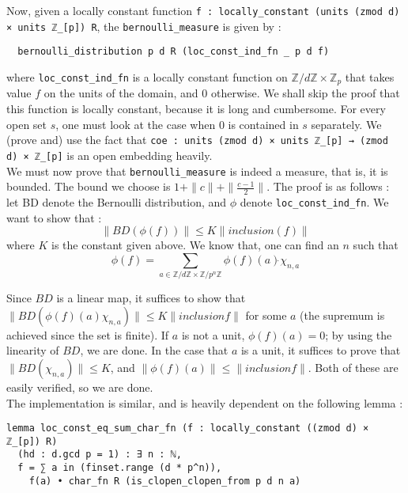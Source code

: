 \documentclass[a4paper,UKenglish,cleveref, autoref, thm-restate]{lipics-v2021}
\newcommand{\lean}[1]{\texttt{#1}\xspace} %
\begin{document}
Now, given a locally constant function \lean{f : locally\_constant (units (zmod d) × units ℤ\_[p]) R}, 
the \lean{bernoulli\_measure} is given by : 
\begin{lstlisting}
  bernoulli_distribution p d R (loc_const_ind_fn _ p d f)
\end{lstlisting}
where \lean{loc\_const\_ind\_fn} is a locally constant function on $\mathbb{Z}/d \mathbb{Z} \times \mathbb{Z}_p$ 
that takes value $f$ on the units of the domain, and 0 otherwise. We shall skip the proof that this function is 
locally constant, because it is long and cumbersome. For every open set $s$, one must look at the case when 0 is 
contained in $s$ separately. We (prove and) use the fact that \lean{coe : units (zmod d) × units ℤ\_[p] → (zmod d) × ℤ\_[p]} 
is an open embedding heavily. \\

We must now prove that \lean{bernoulli\_measure} is indeed a measure, that is, it is bounded. The bound we choose is 
$1 + \parallel c \parallel + \parallel \frac{c - 1}{2} \parallel$. The proof is as follows : let BD denote the Bernoulli 
distribution, and $\phi$ denote \lean{loc\_const\_ind\_fn}. We want to show that : 
$$ \parallel BD (\phi (f)) \parallel \le K \parallel inclusion (f) \parallel $$
where $K$ is the constant given above. We know that, one can find an $n$ such that 
$$\phi (f) = \sum_{a \in \mathbb{Z}/d \mathbb{Z} \times \mathbb{Z} /p^n \mathbb{Z}} \phi(f) (a) \dot{} \chi_{n,a}$$

Since $BD$ is a linear map, it suffices to show that 
$\parallel BD (\phi (f)(a) \chi_{n, a}) \parallel \le K \parallel inclusion f \parallel$ for some $a$ (the supremum is achieved 
since the set is finite). If $a$ is not a unit, $\phi (f) (a) = 0$; by using the linearity of $BD$, we are done. 
In the case that $a$ is a unit, it suffices to prove that $\parallel BD(\chi_{n, a}) \parallel \le K$, and 
$\parallel \phi (f) (a) \parallel \le \parallel inclusion f \parallel$. Both of these are easily verified, so we are done. \\

The implementation is similar, and is heavily dependent on the following lemma : 
\begin{lstlisting}
lemma loc_const_eq_sum_char_fn (f : locally_constant ((zmod d) × ℤ_[p]) R) 
  (hd : d.gcd p = 1) : ∃ n : ℕ, 
  f = ∑ a in (finset.range (d * p^n)), 
    f(a) • char_fn R (is_clopen_clopen_from p d n a)
\end{lstlisting}
\end{document}

